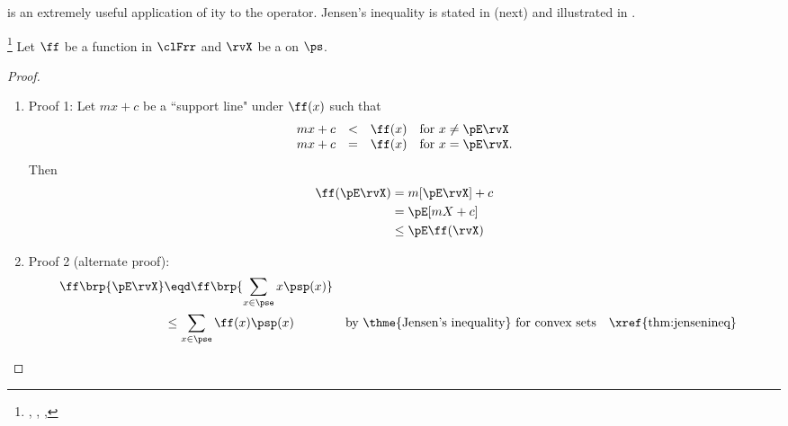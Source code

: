  is an extremely useful application of ity  to the
 operator.
Jensen's inequality is stated in  (next)
and illustrated in .
\begin{corollary}
\footnote{
  ,
  ,
  ,
  }
\label{cor:jensen}
Let $\ff$ be a function in $\clFrr$ and $\rvX$ be a  on $\ps$.
\end{corollary}
\begin{proof}
\begin{enumerate}
  \item Proof 1:
Let $mx+c$ be a ``support line" under $\ff(x)$  such that
\[
  \begin{array}{rcll}
    mx+c &<& \ff(x) & \mbox{for } x\ne \pE\rvX \\
    mx+c &=& \ff(x) & \mbox{for } x=\pE\rvX.
  \end{array}
\]
Then
\begin{align*}
  \ff(\pE\rvX)
    &=   m[\pE\rvX] + c
  \\&=   \pE[mX + c]
  \\&\le \pE\ff(\rvX)
\end{align*}

  \item Proof 2 (alternate proof):
    \begin{align*}
      \ff\brp{\pE\rvX}
        &\eqd \ff\brp{\sum_{x\in\pse} x \psp(x)}
      \\&\le \sum_{x\in\pse} \ff(x) \psp(x)
        && \text{by \thme{Jensen's inequality} for convex sets}
        && \text{\xref{thm:jensenineq}}
    \end{align*}
\end{enumerate}
\end{proof}

